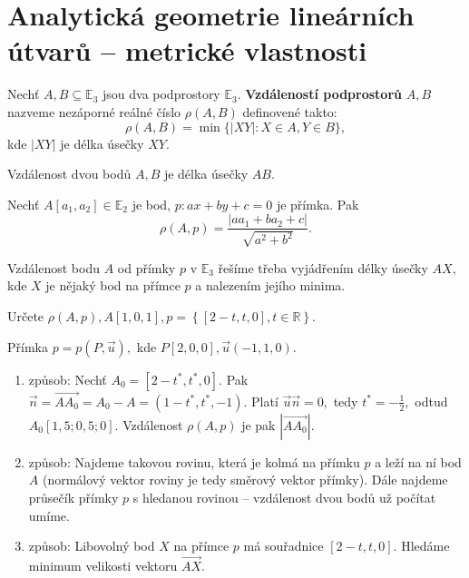 \section{Analytická geometrie lineárních útvarů -- metrické vlastnosti}
\begin{definition}
    Nechť $A,B\subseteq \mathbb E_3$ jsou dva podprostory $\mathbb E_3$. \textbf{Vzdáleností
    podprostorů} $A,B$ nazveme nezáporné reálné číslo $\rho(A,B)$ definovené takto:
    $$\rho(A,B) = \min \{ |XY|: X\in A, Y\in B \},$$
    kde $|XY|$ je délka úsečky $XY.$
\end{definition}

\begin{veta}
    Vzdálenost dvou bodů $A,B$ je délka úsečky $AB.$
\end{veta}

\begin{veta}
    Nechť $A[a_1,a_2]\in \mathbb E_2$ je bod, $p:ax+by+c=0$ je přímka. Pak
    $$\rho(A,p)=\frac{|aa_1+ba_2+c|}{\sqrt{a^2+b^2} }.$$
\end{veta}

\begin{pozn}
    Vzdálenost bodu $A$ od přímky $p$ v $\mathbb E_3$ řešíme třeba vyjádřením délky úsečky
    $AX,$ kde $X$ je nějaký bod na přímce $p$ a nalezením jejího minima.
\end{pozn}

\begin{priklad}\label{primkaabod}
Určete $\rho(A,p), A[1,0,1], p=\left \{ [2-t,t,0],t \in \mathbb R \right \} $.
\end{priklad}

\begin{reseni}
Přímka $p=p(P,\vec u), $ kde $P[2,0,0],\vec u(-1,1,0).$
\begin{enumerate}[1.]
\item způsob: Nechť $A_0=[2-t^*,t^*,0]$. Pak $\vec n = \overrightarrow{AA_0}=A_0-A=(1-t^*,t^*,-1).$
Platí $\vec u\vec n=0,$ tedy $t^*=-\frac{1}{2},$ odtud $A_0[1,5;0,5;0].$ Vzdálenost
$\rho(A,p)$ je pak $|\overrightarrow{AA_0}|.$
\item způsob: Najdeme takovou rovinu, která je kolmá na přímku $p$ a leží na ní bod $A$
(normálový vektor roviny je tedy směrový vektor přímky). Dále najdeme průsečík přímky
$p$ s hledanou rovinou -- vzdálenost dvou bodů už počítat umíme.
\item způsob: Libovolný bod $X$ na přímce $p$ má souřadnice $[2-t,t,0]$. Hledáme
minimum velikosti vektoru $\overrightarrow{AX}.$
\end{enumerate}
\end{reseni}

